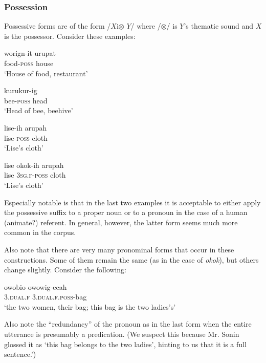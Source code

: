 \documentclass[pdftex,12pt,letterpaper]{article}
\let\ipa\textipa
\def\sw{\ipa{\super w}}
\begin{document}
\subsubsection{Possession}

Possessive forms are of the form /$X$i$\otimes$ $Y$/ where /$\otimes$/ is $Y$'s thematic sound and $X$ is the possessor. Consider these examples:

\begin{exe}
\ex
\gll worig\ipa{1}n-it urupat \\
food-\textsc{poss} house \\
\trans `House of food, restaurant'

\ex
\gll kurukur-ig \ipa{b@r@g} \\
bee-\textsc{poss} head \\
\trans `Head of bee, beehive'

\ex
\gll lise-ih arupah \\
lise-\textsc{poss} cloth \\
\trans `Lise's cloth'

\ex
\gll lise ok\sw ok\sw-ih arupah \\
lise \textsc{3sg.f}-\textsc{poss} cloth \\
\trans `Lise's cloth'

\end{exe}

Especially notable is that in the last two examples it is acceptable to either apply the possessive suffix to a proper noun or to a pronoun in the case of a human (animate?) referent. In general, however, the latter form seems much more common in the corpus.

Also note that there are very many pronominal forms that occur in these constructions. Some of them remain the same (as in the case of \emph{ok\sw ok\sw}), but others change slightly. Consider the following:

\begin{exe}
\ex
\gll owobio owowig-ecah\sw \\
\textsc{3.dual.f} \textsc{3.dual.f.poss}-bag \\
`the two women, their bag; this bag is the two ladies's'

\end{exe}

Also note the ``redundancy'' of the pronoun as in the last form when the entire utterance is presumably a predication. (We suspect this because Mr. Sonin glossed it as `this bag belongs to the two ladies', hinting to us that it is a full sentence.')
\end{document}
